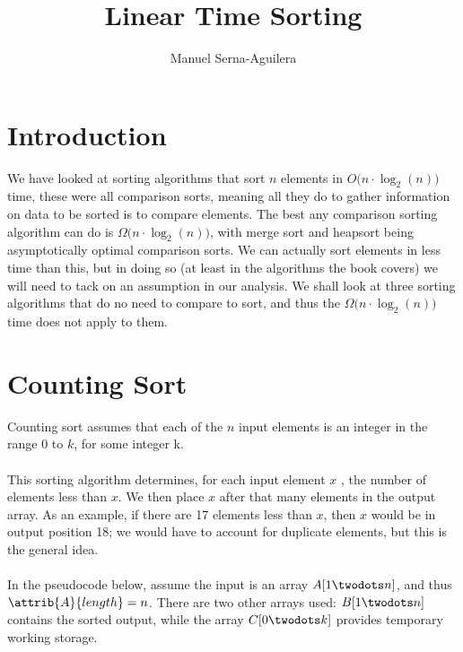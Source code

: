 \documentclass[12pt]{article}
\title{Linear Time Sorting}
\author{Manuel Serna-Aguilera}
\date{}
\begin{document}
\maketitle

\section*{Introduction}
We have looked at sorting algorithms that sort $n$ elements in $O(n \cdot \log_2{(n))}$ time, these were all comparison sorts, meaning all they do to gather information on data to be sorted is to compare elements. The best any comparison sorting algorithm can do is $\Omega(n \cdot \log_2{(n))}$, with merge sort and heapsort being asymptotically optimal comparison sorts. We can actually sort elements in less time than this, but in doing so (at least in the algorithms the book covers) we will need to tack on an assumption in our analysis. We shall look at three sorting algorithms that do no need to compare to sort, and thus the $\Omega(n \cdot \log_2{(n))}$ time does not apply to them.

\section*{Counting Sort}
Counting sort assumes that each of the $n$ input elements is an integer in the range 0 to $k$,  for some integer k.
\\ \\
This sorting algorithm determines, for each input element $x$ , the number of elements less than $x$. We then place $x$ after that many elements in the output array. As an example, if there are 17 elements less than $x$, then $x$ would be in output position 18; we would have to account for duplicate elements, but this is the general idea.
\\ \\
In the pseudocode below, assume the input is an array $A[1 \twodots n]$, and thus $\attrib{A}{length} = n$. There are two other arrays used: $B[1 \twodots n]$ contains the sorted output,  while the array $C[0 \twodots k]$ provides temporary working storage.

\clearpage
\end{document}
